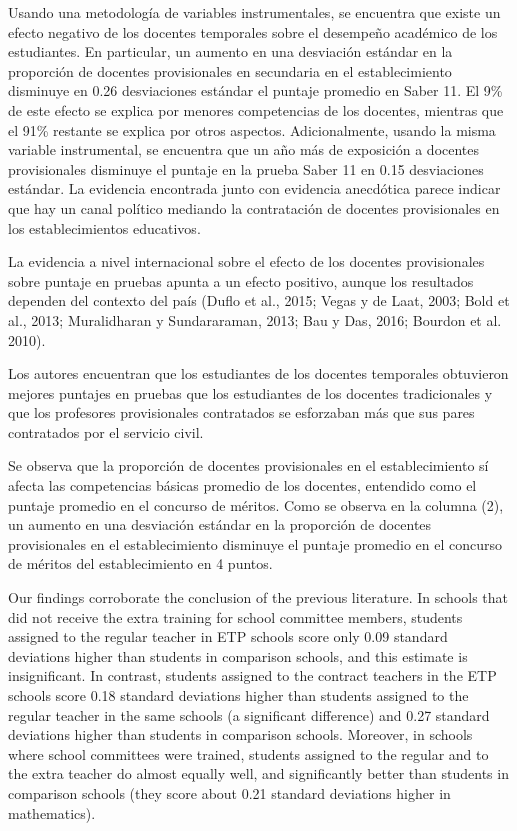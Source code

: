 Usando una metodología de variables instrumentales, se encuentra que existe un efecto negativo de los docentes temporales sobre el desempeño académico de los estudiantes. En particular, un aumento en una desviación estándar en la proporción de docentes provisionales en secundaria en el establecimiento disminuye en 0.26 desviaciones estándar el puntaje promedio en Saber 11. El 9\% de este efecto se explica por menores competencias de los docentes, mientras que el 91\% restante se explica por otros aspectos. Adicionalmente, usando la misma variable instrumental, se encuentra que un año más de exposición a docentes provisionales disminuye el puntaje en la prueba Saber 11 en 0.15 desviaciones estándar. La evidencia encontrada junto con evidencia anecdótica parece indicar que hay un canal político mediando la contratación de docentes provisionales en los establecimientos educativos. \citep{Ayala_2017}


La evidencia a nivel internacional sobre el efecto de los docentes provisionales sobre puntaje en pruebas apunta a un efecto positivo, aunque los resultados dependen del contexto del país (Duflo et al., 2015; Vegas y de Laat, 2003; Bold et al., 2013; Muralidharan y Sundararaman, 2013; Bau y Das, 2016; Bourdon et al. 2010). \citep{Ayala_2017}

Los autores encuentran que los estudiantes de los docentes temporales obtuvieron mejores puntajes en pruebas que los estudiantes de los docentes tradicionales y que los profesores provisionales contratados se esforzaban más que sus pares contratados por el servicio civil.
\citep{Duflo_et_al_2015}


Se observa que la proporción de docentes provisionales en el establecimiento sí afecta las
competencias básicas promedio de los docentes, entendido como el puntaje promedio en el concurso de méritos. Como se observa en la columna (2), un aumento en una desviación estándar en la proporción de docentes provisionales en el establecimiento disminuye el puntaje promedio en el concurso de méritos del establecimiento en 4 puntos. \citep{Ayala_2017}


Our findings corroborate the conclusion of the previous literature. In schools that did not receive the extra training for school committee members, students assigned to the regular teacher in ETP schools score only 0.09 standard deviations higher than students in comparison schools, and this estimate is insignificant. In contrast, students assigned to the contract teachers in the ETP schools score 0.18 standard deviations higher than students assigned to the regular teacher in the same schools (a significant difference) and 0.27 standard deviations higher than students in comparison schools. Moreover, in schools where school committees were trained, students assigned to the regular and to the extra teacher do almost
equally well, and significantly better than students in comparison schools (they score about 0.21 standard deviations higher in mathematics). \citep{Duflo_et_al_2009}

